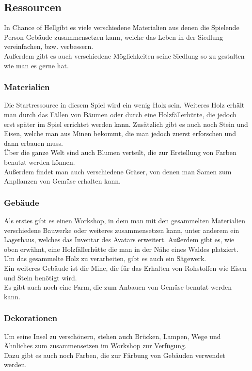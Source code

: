 \documentclass[paper=A4,pagesize=auto,12pt,headinclude=true,footinclude=true,BCOR=0mm,DIV=calc]{scrartcl}
\newcommand{\sectionspace}{
	\vspace{0.5cm}
}
\newcommand{\gametitle}{Chance of Hell}
\begin{document}


\sectionspace
\subsection{Ressourcen}\label{sec:Ressourcen}
In \gametitle gibt es viele verschiedene Materialien  aus denen die Spielende Person Gebäude zusammensetzen kann, welche das Leben in der Siedlung vereinfachen, bzw. verbessern.\\
Außerdem gibt es auch verschiedene Möglichkeiten seine Siedlung so zu gestalten wie man es gerne hat. 

\subsubsection{Materialien}
Die Startressource in diesem Spiel wird ein wenig Holz sein. Weiteres Holz erhält man durch das Fällen von Bäumen oder durch eine Holzfällerhütte, die jedoch erst später im Spiel errichtet werden kann. Zusätzlich gibt es auch noch Stein und Eisen, welche man aus Minen bekommt, die man jedoch zuerst erforschen und dann erbauen muss.\\
Über die ganze Welt sind auch Blumen verteilt, die zur Erstellung von Farben benutzt werden können.\\
Außerdem findet man auch verschiedene Gräser, von denen man Samen zum Anpflanzen von Gemüse erhalten kann. 

\subsubsection{Gebäude}
Als erstes gibt es einen Workshop, in dem man mit den gesammelten Materialien verschiedene Bauwerke oder weiteres zusammensetzen kann, unter anderem ein Lagerhaus, welches das Inventar des Avatars erweitert. Außerdem gibt es, wie oben erwähnt, eine Holzfällerhütte die man in der Nähe eines Waldes platziert. Um das gesammelte Holz zu verarbeiten, gibt es auch ein Sägewerk.\\
Ein weiteres Gebäude ist die Mine, die für das Erhalten von Rohstoffen wie Eisen und Stein benötigt wird.\\
Es gibt auch noch eine Farm, die zum Anbauen von Gemüse benutzt werden kann.

\subsubsection{Dekorationen}
Um seine Insel zu verschönern, stehen auch Brücken, Lampen, Wege und Ähnliches zum zusammensetzen im Workshop zur Verfügung.\\
Dazu gibt es auch noch Farben, die zur Färbung von Gebäuden verwendet werden.
\end{document}
